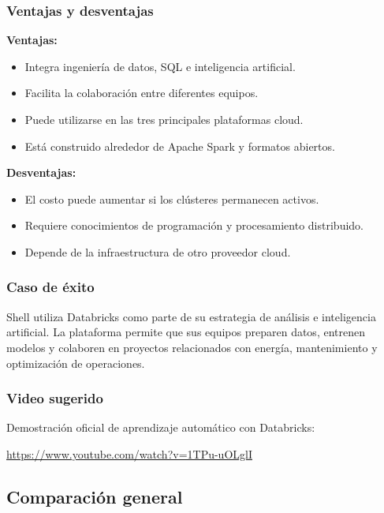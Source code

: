\subsubsection*{Ventajas y desventajas}

\textbf{Ventajas:}

\begin{itemize}
    \item Integra ingeniería de datos, SQL e inteligencia artificial.
    \item Facilita la colaboración entre diferentes equipos.
    \item Puede utilizarse en las tres principales plataformas cloud.
    \item Está construido alrededor de Apache Spark y formatos abiertos.
\end{itemize}

\textbf{Desventajas:}

\begin{itemize}
    \item El costo puede aumentar si los clústeres permanecen activos.
    \item Requiere conocimientos de programación y procesamiento distribuido.
    \item Depende de la infraestructura de otro proveedor cloud.
\end{itemize}

\subsubsection*{Caso de éxito}

Shell utiliza Databricks como parte de su estrategia de análisis e
inteligencia artificial. La plataforma permite que sus equipos preparen datos,
entrenen modelos y colaboren en proyectos relacionados con energía,
mantenimiento y optimización de operaciones.

\subsubsection*{Video sugerido}

Demostración oficial de aprendizaje automático con Databricks:

\url{https://www.youtube.com/watch?v=1TPu-uOLglI}


\subsection{Comparación general}

